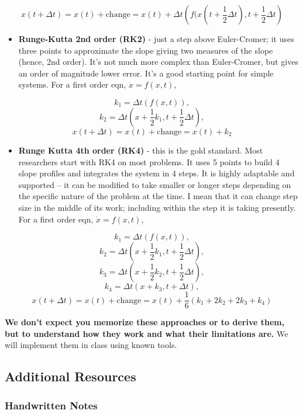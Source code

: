 \[x(t+\Delta t) = x(t) + \textrm{change} = x(t) + \Delta t \left(f(x(t+\dfrac{1}{2}\Delta t), t+\dfrac{1}{2}\Delta t\right)\]

\begin{itemize}
\tightlist
\item
  \textbf{Runge-Kutta 2nd order (RK2)} - just a step above Euler-Cromer;
  it uses three points to approximate the slope giving two measures of
  the slope (hence, 2nd order). It's not much more complex than
  Euler-Cromer, but gives an order of magnitude lower error. It's a good
  starting point for simple systems. For a first order eqn,
  \(\dot{x}=f(x,t)\),
\end{itemize}

\[k_1 = \Delta t\left(f(x,t)\right),\]
\[k_2 =  \Delta t\left(x+\dfrac{1}{2}k_1, t+\dfrac{1}{2}\Delta t\right),\]
\[x(t+\Delta t) = x(t) + \textrm{change} = x(t) + k_2\]

\begin{itemize}
\tightlist
\item
  \textbf{Runge Kutta 4th order (RK4)} - this is the gold standard. Most
  researchers start with RK4 on most problems. It uses 5 points to build
  4 slope profiles and integrates the system in 4 steps. It is highly
  adaptable and supported -- it can be modified to take smaller or
  longer steps depending on the specific nature of the problem at the
  time. I mean that it can change step size in the middle of its work;
  including within the step it is taking presently. For a first order
  eqn, \(\dot{x}=f(x,t)\),
\end{itemize}

\[k_1 = \Delta t\left(f(x,t)\right),\]
\[k_2 =  \Delta t\left(x+\dfrac{1}{2}k_1, t+\dfrac{1}{2}\Delta t\right),\]
\[k_3 =  \Delta t\left(x+\dfrac{1}{2}k_2, t+\dfrac{1}{2}\Delta t\right),\]
\[k_4 =  \Delta t\left(x+k_3, t+\Delta t\right),\]
\[x(t+\Delta t) = x(t) + \textrm{change} = x(t) + \dfrac{1}{6}\left(k_1 + 2k_2 +2k_3 +k_4\right)\]

\textbf{We don't expect you memorize these approaches or to derive them,
but to understand how they work and what their limitations are.} We will
implement them in class using known tools.

\subsection{Additional Resources}\label{additional-resources}

\subsubsection{Handwritten Notes}\label{handwritten-notes}

